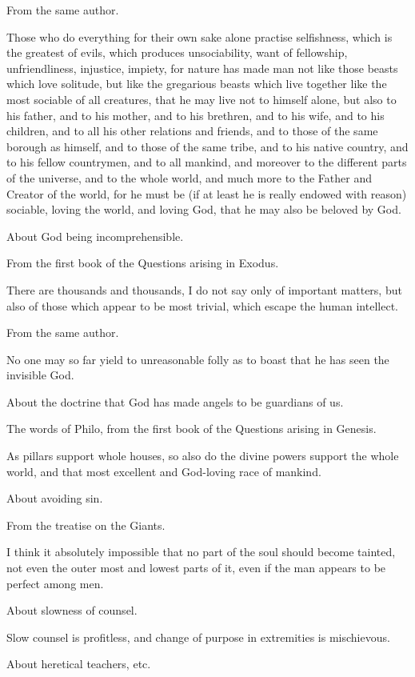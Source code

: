 From the same author.

Those who do everything for their own sake alone practise selfishness, which is the greatest of
evils, which produces unsociability, want of fellowship, unfriendliness, injustice, impiety, for nature
has made man not like those beasts which love solitude, but like the gregarious beasts which live
together like the most sociable of all creatures, that he may live not to himself alone, but also to his
father, and to his mother, and to his brethren, and to his wife, and to his children, and to all his
other relations and friends, and to those of the same borough as himself, and to those of the same
tribe, and to his native country, and to his fellow countrymen, and to all mankind, and moreover to
the different parts of the universe, and to the whole world, and much more to the Father and
Creator of the world, for he must be (if at least he is really endowed with reason) sociable, loving
the world, and loving God, that he may also be beloved by God.

About God being incomprehensible.

From the first book of the Questions arising in Exodus.

There are thousands and thousands, I do not say only of important matters, but also of those which
appear to be most trivial, which escape the human intellect.

From the same author.

No one may so far yield to unreasonable folly as to boast that he has seen the invisible God.

About the doctrine that God has made angels to be guardians of us.

The words of Philo, from the first book of the Questions arising in Genesis.

As pillars support whole houses, so also do the divine powers support the whole world, and that
most excellent and God-loving race of mankind.

About avoiding sin.

From the treatise on the Giants.

I think it absolutely impossible that no part of the soul should become tainted, not even the outer
most and lowest parts of it, even if the man appears to be perfect among men.

About slowness of counsel.

Slow counsel is profitless, and change of purpose in extremities is mischievous.

About heretical teachers, etc.

